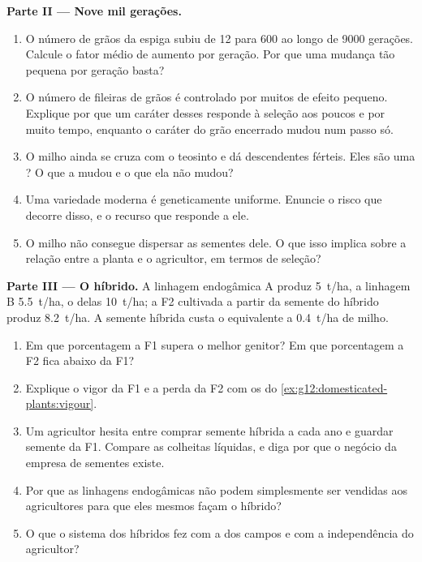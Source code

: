 \begin{problem}
\medskip
\noindent\textbf{Parte II --- Nove mil gerações.}
\begin{enumerate}[resume]
  \item O número de grãos da espiga subiu de 12 para 600 ao longo de
        9000 gerações. Calcule o fator médio de aumento por geração.
        Por que uma mudança tão pequena por geração basta?
  \item O número de fileiras de grãos é controlado por muitos  de
        efeito pequeno. Explique por que um caráter desses responde à
        seleção aos poucos e por muito tempo, enquanto o caráter do
        grão encerrado mudou num passo só.
  \item O milho ainda se cruza com o teosinto e dá descendentes
        férteis. Eles são uma ? O que a  mudou e o
        que ela não mudou?
  \item Uma variedade moderna é geneticamente uniforme. Enuncie o risco
        que decorre disso, e o recurso que responde a ele.
  \item O milho não consegue dispersar as sementes dele. O que isso
        implica sobre a relação entre a planta e o agricultor, em
        termos de seleção?
\end{enumerate}

\medskip
\noindent\textbf{Parte III --- O híbrido.}
A linhagem endogâmica A produz \qty{5}{t/ha}, a linhagem B
\qty{5.5}{t/ha}, o  delas \qty{10}{t/ha}; a F2 cultivada a
partir da semente do híbrido produz \qty{8.2}{t/ha}. A semente híbrida
custa o equivalente a \qty{0.4}{t/ha} de milho.
\begin{enumerate}[resume]
  \item Em que porcentagem a F1 supera o melhor genitor? Em que
        porcentagem a F2 fica abaixo da F1?
  \item Explique o vigor da F1 e a perda da F2 com os  do
        \cref{ex:g12:domesticated-plants:vigour}.
  \item Um agricultor hesita entre comprar semente híbrida a cada ano e
        guardar semente da F1. Compare as colheitas líquidas, e diga
        por que o negócio da empresa de sementes existe.
  \item Por que as linhagens endogâmicas não podem simplesmente ser
        vendidas aos agricultores para que eles mesmos façam o híbrido?
  \item O que o sistema dos híbridos fez com a  dos
        campos e com a independência do agricultor?
\end{enumerate}


\end{problem}

